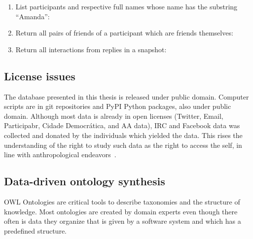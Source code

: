 \begin{enumerate}[leftmargin=0cm]
{		\}}
	\item List participants and respective full names whose name has the substring ``Amanda'':\\
	\item Return all pairs of friends of a participant which are friends themselves:\\
	\item Return all interactions from replies in a snapshot:\\
\end{enumerate}

\subsection{License issues}
The database presented in this thesis is released under public domain.
Computer scripts are in git repositories and PyPI Python packages, also under public domain.
Although most data is already in open licenses (Twitter, Email, Participabr, Cidade Democrática, and AA data), IRC and Facebook data was collected
and donated by the individuals which yielded the data.
This rises the understanding of the right to study such data as the right to access the self,
in line with anthropological endeavors~\cite{antphy,antphy2}.


\subsection{Data-driven ontology synthesis}
OWL Ontologies are critical tools to describe taxonomies and the
structure of knowledge.
Most ontologies are created by domain experts even though there often is data they
organize that is given by a software system and which has a predefined
structure. 

